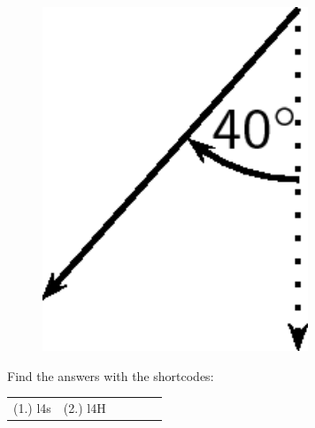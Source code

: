 \begin{enumerate}[noitemsep, label=\textbf{\arabic*}. ]
\begin{enumerate}[noitemsep, label=\textbf{\alph*}. ]
	\begin{figure}[H] %
    \begin{center}
    \label{m38812*id187683!!!underscore!!!media}\label{m38812*id187683!!!underscore!!!printimage}\includegraphics[width=300px]{col11305.imgs/m38812_PG11C1_009.png} %
        
      \vspace{2pt}
    \vspace{.1in}
    
    \end{center}

 \end{figure}   

    \addtocounter{footnote}{-0}
    \end{enumerate}
                \end{enumerate}
        
        

      
    
    \label{m38812*cid6}
\par {} Find the answers with the shortcodes:
 \par \begin{tabular}[h]{cccccc}
 (1.) l4s  &  (2.) l4H  & \end{tabular}



